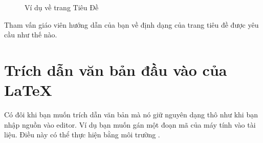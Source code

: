 \documentclass[a4paper]{report}
\begin{document}
\begin{figure}[htbp]
\begin{center}
\end{center}
\caption{Ví dụ về trang Tiêu Đề}
\label{fig:titlepage}
\end{figure}

\noindent Tham vấn giáo viên hướng dẫn của bạn về định dạng của trang tiêu đề  được yêu cầu như thế nào.



\section{Trích dẫn văn bản đầu vào của \LaTeX{}}

Có đôi khi bạn muốn trích dẫn văn bản mà nó giữ nguyên dạng thô như khi bạn nhập nguồn vào editor. Ví dụ bạn muốn gán một đoạn mã của máy tính vào tài liệu. Điều này có thể thực hiện bằng môi trường .
\end{document}
